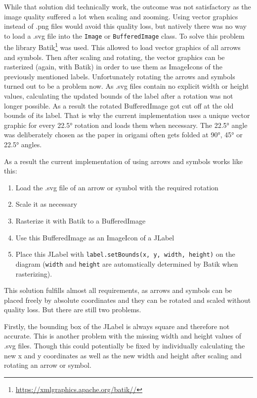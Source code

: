 While that solution did technically work, the outcome was not satisfactory as the image quality suffered a lot when scaling and zooming. Using vector graphics instead of .png files would avoid this quality loss, but natively there was no way to load a .svg file into the \texttt{Image} or \texttt{BufferedImage} class. To solve this problem the library Batik\footnote{\url{https://xmlgraphics.apache.org/batik//}} was used. This allowed to load vector graphics of all arrows and symbols. Then after scaling and rotating, the vector graphics can be rasterized (again, with Batik) in order to use them as ImageIcons of the previously mentioned labels. Unfortunately rotating the arrows and symbols turned out to be a problem now. As .svg files contain no explicit width or height values, calculating the updated bounds of the label after a rotation was not longer possible. As a result the rotated BufferedImage got cut off at the old bounds of its label. That is why the current implementation uses a unique vector graphic for every 22.5° rotation and loads them when necessary. The 22.5° angle was deliberately chosen as the paper in origami often gets folded at 90°, 45° or 22.5° angles.%

As a result the current implementation of using arrows and symbols works like this: 

\begin{enumerate}
	\item Load the .svg file of an arrow or symbol with the required rotation
	\item Scale it as necessary
	\item Rasterize it with Batik to a BufferedImage
	\item Use this BufferedImage as an ImageIcon of a JLabel
	\item Place this JLabel with \texttt{label.setBounds(x, y, width, height)}  on the diagram (\texttt{width} and \texttt{height} are automatically determined by Batik when rasterizing).
\end{enumerate}

This solution fulfills almost all requirements, as arrows and symbols can be placed freely by absolute coordinates and they can be rotated and scaled without quality loss. But there are still two problems.

Firstly, the bounding box of the JLabel is always square and therefore not accurate. This is another problem with the missing width and height values of .svg files. Though this could potentially be fixed by individually calculating the new x and y coordinates as well as the new width and height after scaling and rotating an arrow or symbol.

